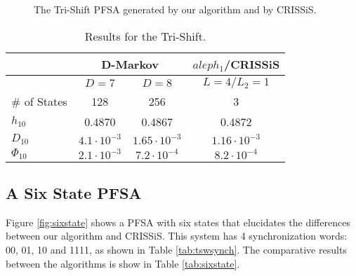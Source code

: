 {\begin{figure}
\centering
{}
\caption{The Tri-Shift PFSA generated by our algorithm and by CRISSiS.\label{fig:trishiftgen}}
\end{figure}

\begin{table}
\centering
\caption{Results for the Tri-Shift. \label{tab:trishift}}
\begin{tabular}{|l|c|c|c|}
\hline
 & \multicolumn{2}{c|}{\textbf{D-Markov}} & \textbf{$aleph_1$/CRISSiS}\\
 \hline
 & $D=7$ & $D=8$ & $L=4/L_2=1$ \\
\hline
\# of States & 128 & 256 & 3 \\ 
$h_{10}$ & 0.4870 & 0.4867 & 0.4872 \\
$D_{10}$ & $4.1\cdot10^{-3}$ & $1.65\cdot10^{-3}$ & $1.16\cdot10^{-3}$ \\
$\Phi_{10}$ & $2.1\cdot10^{-3}$ & $7.2\cdot10^{-4}$ & $8.2\cdot10^{-4}$ \\
 \hline
\end{tabular}
\end{table}

\subsection{A Six State PFSA}

Figure \ref{fig:sixstate} shows a PFSA with six states that elucidates the differences between our algorithm and CRISSiS. This system has 4 synchronization words: 00, 01, 10 and 1111, as shown in Table \ref{tab:tswsynch}. The comparative results between the algorithms is show in Table \ref{tab:sixstate}.

}
